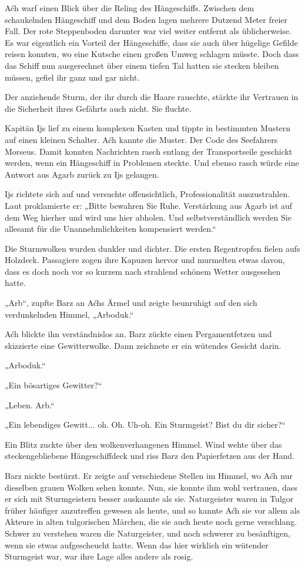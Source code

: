 Aćh warf einen Blick über die Reling des Hängeschiffs. Zwischen dem schaukelnden Hängeschiff und dem Boden lagen mehrere Dutzend Meter freier Fall. Der rote Steppenboden darunter war viel weiter entfernt als üblicherweise. Es war eigentlich ein Vorteil der Hängeschiffe, dass sie auch über hügelige Gefilde reisen konnten, wo eine Kutsche einen großen Umweg schlagen müsste. Doch dass das Schiff nun ausgerechnet über einem tiefen Tal hatten sie stecken bleiben müssen, gefiel ihr ganz und gar nicht.

Der anziehende Sturm, der ihr durch die Haare rauschte, stärkte ihr Vertrauen in die Sicherheit ihres Gefährts auch nicht. Sie fluchte.

Kapitän Ijs lief zu einem komplexen Kasten und tippte in bestimmten Mustern auf einen kleinen Schalter. Aćh kannte die Muster. Der Code des Seefahrers Morseus. Damit konnten Nachrichten rasch entlang der Transportseile geschickt werden, wenn ein Hängeschiff in Problemen steckte. Und ebenso rasch würde eine Antwort aus Agarb zurück zu Ijs gelangen.

Ijs richtete sich auf und versuchte offensichtlich, Professionalität auszustrahlen. Laut proklamierte er: „Bitte bewahren Sie Ruhe. Verstärkung aus Agarb ist auf dem Weg hierher und wird uns hier abholen. Und selbstverständlich werden Sie allesamt für die Unannehmlichkeiten kompensiert werden.“

Die Sturmwolken wurden dunkler und dichter. Die ersten Regentropfen fielen aufs Holzdeck. Passagiere zogen ihre Kapuzen hervor und murmelten etwas davon, dass es doch noch vor so kurzem nach strahlend schönem Wetter ausgesehen hatte.

„Arb“, zupfte Barz an Aćhs Ärmel und zeigte beunruhigt auf den sich verdunkelnden Himmel, „Arboduk.“

Aćh blickte ihn verständnislos an. Barz zückte einen Pergamentfetzen und skizzierte eine Gewitterwolke. Dann zeichnete er ein wütendes Gesicht darin.

„Arboduk.“

„Ein bösartiges Gewitter?“

„Leben. Arb.“

„Ein lebendiges Gewitt... oh. Oh. Uh-oh. Ein Sturmgeist? Bist du dir sicher?“

Ein Blitz zuckte über den wolkenverhangenen Himmel. Wind wehte über das steckengebliebene Hängeschiffdeck und riss Barz den Papierfetzen aus der Hand.

Barz nickte bestürzt. Er zeigte auf verschiedene Stellen im Himmel, wo Aćh nur dieselben grauen Wolken sehen konnte. Nun, sie konnte ihm wohl vertrauen, dass er sich mit Sturmgeistern besser auskannte als sie. Naturgeister waren in Tulgor früher häufiger anzutreffen gewesen als heute, und so kannte Aćh sie vor allem als Akteure in alten tulgorischen Märchen, die sie auch heute noch gerne verschlang. Schwer zu verstehen waren die Naturgeister, und noch schwerer zu besänftigen, wenn sie etwas aufgescheucht hatte. Wenn das hier wirklich ein wütender Sturmgeist war, war ihre Lage alles andere als rosig.

